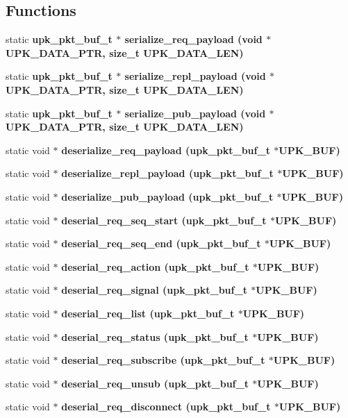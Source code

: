 \subsection*{Functions}
\begin{CompactItemize}
\item 
static \bf{upk\_\-pkt\_\-buf\_\-t} $\ast$ \bf{serialize\_\-req\_\-payload} (void $\ast$UPK\_\-DATA\_\-PTR, size\_\-t UPK\_\-DATA\_\-LEN)
\item 
static \bf{upk\_\-pkt\_\-buf\_\-t} $\ast$ \bf{serialize\_\-repl\_\-payload} (void $\ast$UPK\_\-DATA\_\-PTR, size\_\-t UPK\_\-DATA\_\-LEN)
\item 
static \bf{upk\_\-pkt\_\-buf\_\-t} $\ast$ \bf{serialize\_\-pub\_\-payload} (void $\ast$UPK\_\-DATA\_\-PTR, size\_\-t UPK\_\-DATA\_\-LEN)
\item 
static void $\ast$ \bf{deserialize\_\-req\_\-payload} (\bf{upk\_\-pkt\_\-buf\_\-t} $\ast$UPK\_\-BUF)
\item 
static void $\ast$ \bf{deserialize\_\-repl\_\-payload} (\bf{upk\_\-pkt\_\-buf\_\-t} $\ast$UPK\_\-BUF)
\item 
static void $\ast$ \bf{deserialize\_\-pub\_\-payload} (\bf{upk\_\-pkt\_\-buf\_\-t} $\ast$UPK\_\-BUF)
\item 
static void $\ast$ \bf{deserial\_\-req\_\-seq\_\-start} (\bf{upk\_\-pkt\_\-buf\_\-t} $\ast$UPK\_\-BUF)
\item 
static void $\ast$ \bf{deserial\_\-req\_\-seq\_\-end} (\bf{upk\_\-pkt\_\-buf\_\-t} $\ast$UPK\_\-BUF)
\item 
static void $\ast$ \bf{deserial\_\-req\_\-action} (\bf{upk\_\-pkt\_\-buf\_\-t} $\ast$UPK\_\-BUF)
\item 
static void $\ast$ \bf{deserial\_\-req\_\-signal} (\bf{upk\_\-pkt\_\-buf\_\-t} $\ast$UPK\_\-BUF)
\item 
static void $\ast$ \bf{deserial\_\-req\_\-list} (\bf{upk\_\-pkt\_\-buf\_\-t} $\ast$UPK\_\-BUF)
\item 
static void $\ast$ \bf{deserial\_\-req\_\-status} (\bf{upk\_\-pkt\_\-buf\_\-t} $\ast$UPK\_\-BUF)
\item 
static void $\ast$ \bf{deserial\_\-req\_\-subscribe} (\bf{upk\_\-pkt\_\-buf\_\-t} $\ast$UPK\_\-BUF)
\item 
static void $\ast$ \bf{deserial\_\-req\_\-unsub} (\bf{upk\_\-pkt\_\-buf\_\-t} $\ast$UPK\_\-BUF)
\item 
static void $\ast$ \bf{deserial\_\-req\_\-disconnect} (\bf{upk\_\-pkt\_\-buf\_\-t} $\ast$UPK\_\-BUF)
\item 

\end{CompactItemize}
